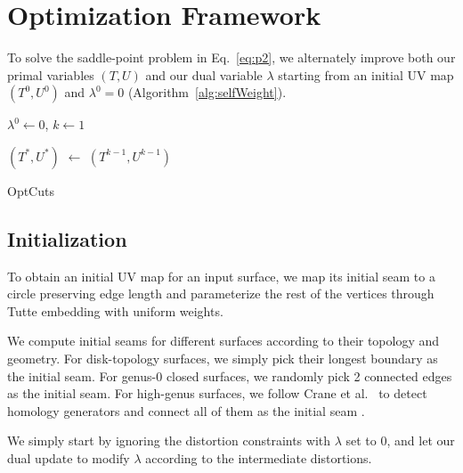 
\section{Optimization Framework}

To solve the saddle-point problem in Eq.~\ref{eq:p2}, we alternately improve both our primal variables $(T, U)$ and our dual variable $\lambda$ starting from an initial UV map $(T^0, U^0)$ and $\lambda^0 = 0$ (Algorithm~\ref{alg:selfWeight}).

\begin{algorithm}[!h]
\SetAlgoLined
{}

$\lambda^0 \leftarrow 0$, $k \leftarrow 1$\;

$(T^*, U^*)$ $\leftarrow$ $(T^{k-1}, U^{k-1})$\; 

\caption{OptCuts}
\label{alg:selfWeight}
\end{algorithm}

\subsection{Initialization}
To obtain an initial UV map for an input surface, we map its initial seam to a circle preserving edge length and parameterize the rest of the vertices through Tutte embedding with uniform weights.

We compute initial seams for different surfaces according to their topology and geometry. For disk-topology surfaces, we simply pick their longest boundary as the initial seam. For genus-0 closed surfaces, we randomly pick 2 connected edges as the initial seam.  For high-genus surfaces, we follow Crane et al.~ to detect homology generators and connect all of them as the initial seam \minchen{[TODO]}.

We simply start by ignoring the distortion constraints with $\lambda$ set to $0$, and let our dual update to modify $\lambda$ according to the intermediate distortions.

